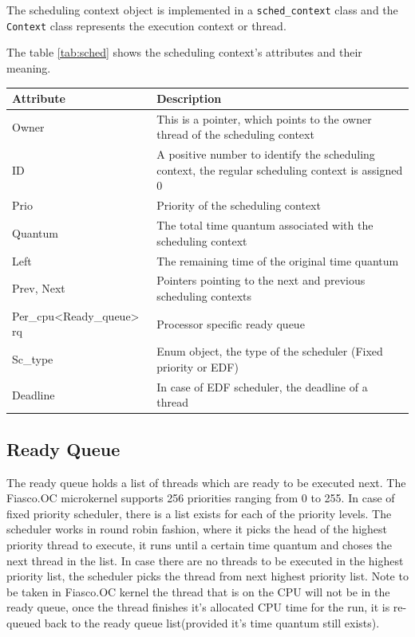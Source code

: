 The scheduling context object is implemented in a \texttt{sched\_context} class and the \texttt{Context} class represents the execution context or thread.

The table \ref{tab:sched} shows the scheduling context's attributes and their meaning.
\begin{center}
\begin{tabular}{|l|p{9cm}|}
\hline 
\textbf{Attribute} & \textbf{Description} \\ \hline

Owner & This is a pointer, which points to the owner thread of the scheduling context\\ \hline

ID & A positive number to identify the scheduling context, the regular scheduling context is assigned 0
\\ \hline

Prio & Priority of the scheduling context \\ \hline

Quantum &  The total time quantum associated with the scheduling context\\ \hline

Left & The remaining time of the original time quantum \\ \hline

Prev, Next & Pointers pointing to the next and previous scheduling contexts \\ \hline

Per\_cpu<Ready\_queue> rq &  Processor specific ready queue \\ \hline

Sc\_type & Enum object, the type of the scheduler (Fixed priority or EDF) \\ \hline

Deadline & In case of EDF scheduler, the deadline of a thread \\ \hline
\end{tabular}
\label{tab:sched}
\end{center}

\subsection{Ready Queue}\label{Foundations:rq}
The ready queue holds a list of threads which are ready to be executed next. The Fiasco.OC microkernel supports 256 priorities ranging from 0 to 255. In case of fixed priority scheduler, there is a list exists for each of the priority levels. The scheduler works in round robin fashion, where it picks the head of the highest priority thread to execute, it runs until a certain time quantum and choses the next thread in the list. In case there are no threads to be executed in the highest priority list, the scheduler picks the thread from next highest priority list. 
Note to be taken in Fiasco.OC kernel the thread that is on the CPU will not be in the ready queue, once the thread finishes it's allocated CPU time for the run, it is re-queued back to the ready queue list(provided it's time quantum still exists).

